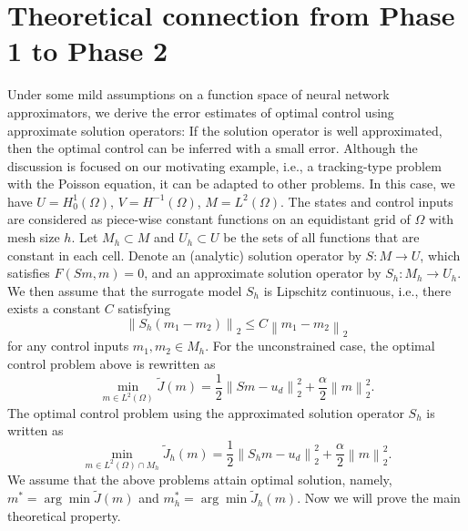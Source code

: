 \documentclass[letterpaper]{article}
\newcommand{\norm}[1]{\left\lVert#1\right\rVert}
\newcommand{\bmm}{m^*}
\newcommand{\bmmh}{m_h^*}
\begin{document}
\section{Theoretical connection from Phase 1 to Phase 2}\label{appendix_theory}
Under some mild assumptions on a function space of neural network approximators, we derive the error estimates of optimal control using approximate solution operators: If the solution operator is well approximated, then the optimal control can be inferred with a small error. Although the discussion is focused on our motivating example, i.e., a tracking-type problem with the Poisson equation, it can be adapted to other problems. In this case, we have $U = H^1_0(\Omega)$, $V = H^{-1}(\Omega)$, $M=L^2(\Omega)$. The states and control inputs are considered as piece-wise constant functions on an equidistant grid of $\Omega$ with mesh size $h$. Let $M_h \subset M$  and $U_h \subset U$ be the sets of all functions that are constant in each cell. Denote an (analytic) solution operator by $S: M\rightarrow U$, which satisfies $F(Sm, m) = 0$, and an approximate solution operator by $S_h: M_h \rightarrow U_h$. We then assume that the surrogate model $S_h$ is Lipschitz continuous, i.e., there exists a constant $C$ satisfying
\begin{equation}
  \norm{S_h (m_1 - m_2)}_2 \leq C \norm{m_1 - m_2}_2
\end{equation}
for any control inputs $m_1, m_2 \in M_h$. For the unconstrained case, the optimal control problem above is rewritten as
\begin{equation}
  \min_{m \in L^2(\Omega)} \tilde{J}(m) = \frac{1}{2} \norm{Sm - u_d}_2^2 + \frac{\alpha}{2} \norm{m}_2^2. \tag{$P$}
\end{equation}
The optimal control problem using the approximated solution operator $S_h$ is written as
\begin{equation}
  \min_{m \in L^2(\Omega) \cap M_h} \tilde{J}_h(m) = \frac{1}{2} \norm{S_h m - u_d}_2^2 + \frac{\alpha}{2} \norm{m}_2^2. \tag{$P_h$}
\end{equation}
We assume that the above problems attain optimal solution, namely, $\bmm = \arg \min \tilde{J}(m)$ and $\bmmh = \arg \min \tilde{J}_h(m)$. Now we will prove the main theoretical property. 
\end{document}
